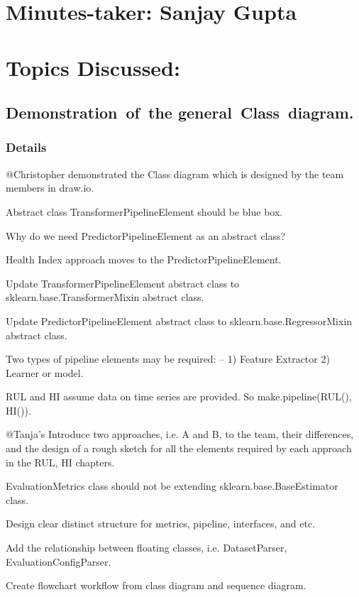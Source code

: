 \documentclass[11pt]{meetingmins} %
\begin{document}
\maketitle

\section{Minutes-taker: Sanjay Gupta}

\section{Topics Discussed:}

\subsection{Demonstration of the general Class diagram.}
    \subsubsection{Details}
        \begin{hiddensubitems}
			\item @Christopher demonstrated the Class diagram which is designed by the team members in draw.io.
            \item Abstract class TransformerPipelineElement should be blue box.
            \item Why do we need PredictorPipelineElement as an abstract class?
            \item Health Index approach moves to the PredictorPipelineElement.
			\item Update TransformerPipelineElement abstract class to sklearn.base.TransformerMixin abstract class.
			\item Update PredictorPipelineElement abstract class to sklearn.base.RegressorMixin abstract class.
			\item Two types of pipeline elements may be required: – 1) Feature Extractor 2) Learner or model.
			\item RUL and HI assume data on time series are provided. So make.pipeline(RUL(), HI()).
			\item @Tanja's Introduce two approaches, i.e. A and B, to the team, their differences, and the design of a rough sketch for all the elements required by each approach in the RUL, HI chapters.
			\item EvaluationMetrics class should not be extending sklearn.base.BaseEstimator class.
			\item Design clear distinct structure for metrics, pipeline, interfaces, and etc.
			\item Add the relationship between floating classes, i.e. DatasetParser, EvaluationConfigParser.
			\item Create flowchart workflow from class diagram and sequence diagram.
        \end{hiddensubitems}
\end{document}
